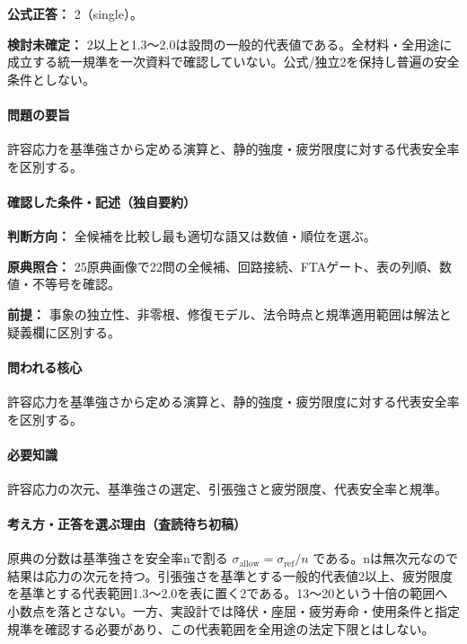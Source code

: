 \textbf{公式正答：} 2（single）。

\par\textbf{検討未確定：} 2以上と1.3～2.0は設問の一般的代表値である。全材料・全用途に成立する統一規準を一次資料で確認していない。公式/独立2を保持し普遍の安全条件としない。

\paragraph{問題の要旨} 許容応力を基準強さから定める演算と、静的強度・疲労限度に対する代表安全率を区別する。

\paragraph{確認した条件・記述（独自要約）}\mbox{}\par

\noindent\textbf{判断方向：} 全候補を比較し最も適切な語又は数値・順位を選ぶ。\par

\noindent\textbf{原典照合：} 25原典画像で22問の全候補、回路接続、FTAゲート、表の列順、数値・不等号を確認。\par

\noindent\textbf{前提：} 事象の独立性、非零根、修復モデル、法令時点と規準適用範囲は解法と疑義欄に区別する。\par

\paragraph{問われる核心} 許容応力を基準強さから定める演算と、静的強度・疲労限度に対する代表安全率を区別する。

\paragraph{必要知識} 許容応力の次元、基準強さの選定、引張強さと疲労限度、代表安全率と規準。

\paragraph{考え方・正答を選ぶ理由（査読待ち初稿）} 原典の分数は基準強さを安全率nで割る \(\sigma_{\mathrm{allow}}=\sigma_{\mathrm{ref}}/n\) である。nは無次元なので結果は応力の次元を持つ。引張強さを基準とする一般的代表値2以上、疲労限度を基準とする代表範囲1.3～2.0を表に置く2である。13～20という十倍の範囲へ小数点を落とさない。一方、実設計では降伏・座屈・疲労寿命・使用条件と指定規準を確認する必要があり、この代表範囲を全用途の法定下限とはしない。

